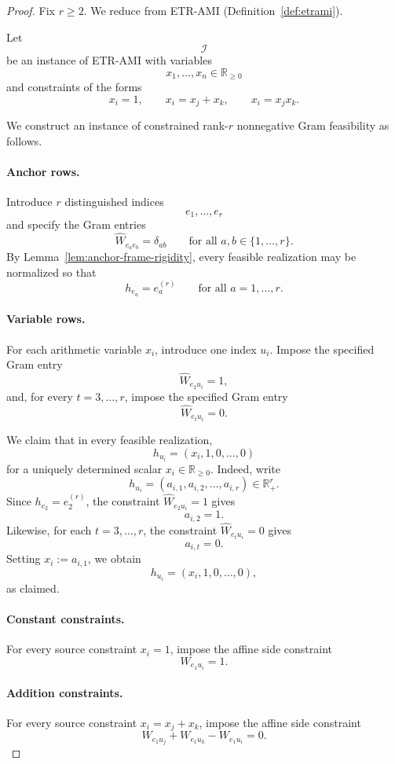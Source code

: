 \documentclass[10pt,a4paper]{amsart}
\begin{document}
\begin{proof}
Fix \(r\ge 2\). We reduce from \textsc{ETR-AMI}
(Definition~\ref{def:etrami}).

Let
\[
\mathcal{I}
\]
be an instance of \textsc{ETR-AMI} with variables
\[
x_1,\dots,x_n\in\mathbb{R}_{\ge 0}
\]
and constraints of the forms
\[
x_i=1,\qquad x_i=x_j+x_k,\qquad x_i=x_jx_k.
\]

We construct an instance of constrained rank-$r$ nonnegative Gram feasibility
as follows.

\paragraph{Anchor rows.}
Introduce \(r\) distinguished indices
\[
e_1,\dots,e_r
\]
and specify the Gram entries
\[
\widehat{W}_{e_a e_b}=\delta_{ab}
\qquad \text{for all } a,b\in\{1,\dots,r\}.
\]
By Lemma~\ref{lem:anchor-frame-rigidity}, every feasible realization may be
normalized so that
\[
h_{e_a}=e_a^{(r)}
\qquad \text{for all } a=1,\dots,r.
\]

\paragraph{Variable rows.}
For each arithmetic variable \(x_i\), introduce one index \(u_i\).
Impose the specified Gram entry
\[
\widehat{W}_{e_2 u_i}=1,
\]
and, for every \(t=3,\dots,r\), impose the specified Gram entry
\[
\widehat{W}_{e_t u_i}=0.
\]

We claim that in every feasible realization,
\[
h_{u_i}=(x_i,1,0,\dots,0)
\]
for a uniquely determined scalar \(x_i\in\mathbb{R}_{\ge 0}\).
Indeed, write
\[
h_{u_i}=(a_{i,1},a_{i,2},\dots,a_{i,r})\in\mathbb{R}_+^r.
\]
Since \(h_{e_2}=e_2^{(r)}\), the constraint \(\widehat{W}_{e_2 u_i}=1\) gives
\[
a_{i,2}=1.
\]
Likewise, for each \(t=3,\dots,r\), the constraint
\(\widehat{W}_{e_t u_i}=0\) gives
\[
a_{i,t}=0.
\]
Setting \(x_i:=a_{i,1}\), we obtain
\[
h_{u_i}=(x_i,1,0,\dots,0),
\]
as claimed.

\paragraph{Constant constraints.}
For every source constraint \(x_i=1\), impose the affine side constraint
\[
W_{e_1 u_i}=1.
\]

\paragraph{Addition constraints.}
For every source constraint \(x_i=x_j+x_k\), impose the affine side constraint
\[
W_{e_1 u_j}+W_{e_1 u_k}-W_{e_1 u_i}=0.
\]


\end{proof}
\end{document}
